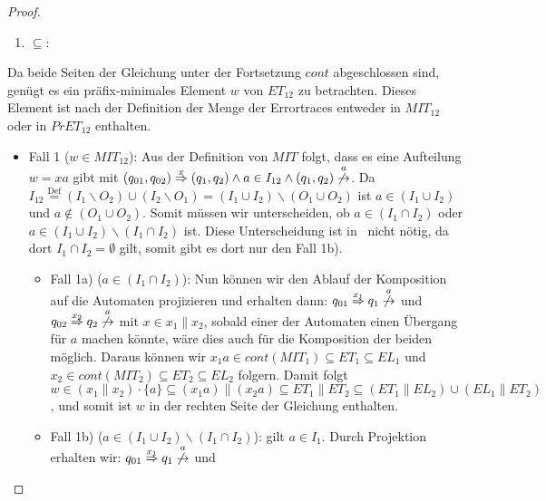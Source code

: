 \begin{proof}
  ~
  \begin{enumerate}
    \item \glqq $\subseteq$\grqq :
  \end{enumerate}
  Da beide Seiten der Gleichung unter der Fortsetzung $cont$ abgeschlossen sind, genügt es ein
  präfix-minimales Element $w$ von $ET_{12}$ zu betrachten. Dieses Element ist
  nach der Definition der Menge der Errortraces entweder in $MIT_{12}$ oder in
  $PrET_{12}$ enthalten.\\
  \begin{itemize}
    \item Fall 1 ($w\in MIT_{12}$): Aus der Definition von $MIT$ folgt, dass es eine
  Aufteilung $w=xa$ gibt mit
  $(q_{01},q_{02})\overset{x}{\Rightarrow}(q_1,q_2)\wedge a\in I_{12}\wedge
  (q_1,q_2)\overset{a}{\not{\hspace{-0.1cm}\rightarrow}}$. Da
  $I_{12}\overset{\mathrm{Def}}{=}(I_1\backslash O_2)\cup (I_2\backslash O_1)=(I_1\cup
  I_2)\backslash (O_1\cup O_2)$ ist $a\in (I_1\cup I_2)$ und $a\notin (O_1\cup
  O_2)$. Somit müssen wir unterscheiden, ob $a\in (I_1\cap I_2)$ oder $a\in
  (I_1\cup I_2)\backslash (I_1\cap I_2)$ ist. Diese Unterscheidung ist
  in~\cite{Vogler2014EIO} nicht nötig, da dort $I_1\cap I_2=\emptyset$ gilt,
  somit gibt es dort nur den Fall 1b).
  \begin{itemize}
    \item Fall 1a) ($a\in (I_1\cap I_2)$): Nun können wir den Ablauf der Komposition
  auf die Automaten projizieren und erhalten dann:
  $q_{01}\overset{x_1}{\Rightarrow} q_1
  \overset{a}{\not{\hspace{-0.1cm}\rightarrow}}$ und
  $q_{02}\overset{x_2}{\Rightarrow} q_2
  \overset{a}{\not{\hspace{-0.1cm}\rightarrow}}$ mit $x\in x_1\|x_2$, sobald einer der Automaten
  einen Übergang für $a$ machen könnte, wäre dies auch für die Komposition der
  beiden möglich. Daraus können wir $x_1a\in cont(MIT_1)\subseteq ET_1\subseteq
  EL_1$ und $x_2\in cont(MIT_2)\subseteq ET_2\subseteq EL_2$ folgern.
  Damit folgt $w\in (x_1\|x_2)\cdot\{a\}\subseteq (x_1a)\|(x_2a)\subseteq
  ET_1\|ET_2\subseteq (ET_1\|EL_2)\cup(EL_1\|ET_2)$, und somit ist $w$ in der
  rechten Seite der Gleichung enthalten.
\item Fall 1b) ($a\in (I_1\cup I_2)\backslash(I_1\cap I_2)$): \OBdA{} gilt
      $a\in I_1$. Durch Projektion erhalten wir:
      $q_{01}\overset{x_1}{\Rightarrow} q_1
      \overset{a}{\not{\hspace{-0.1cm}\rightarrow}}$ und

\end{itemize}
\end{itemize}
\end{proof}
